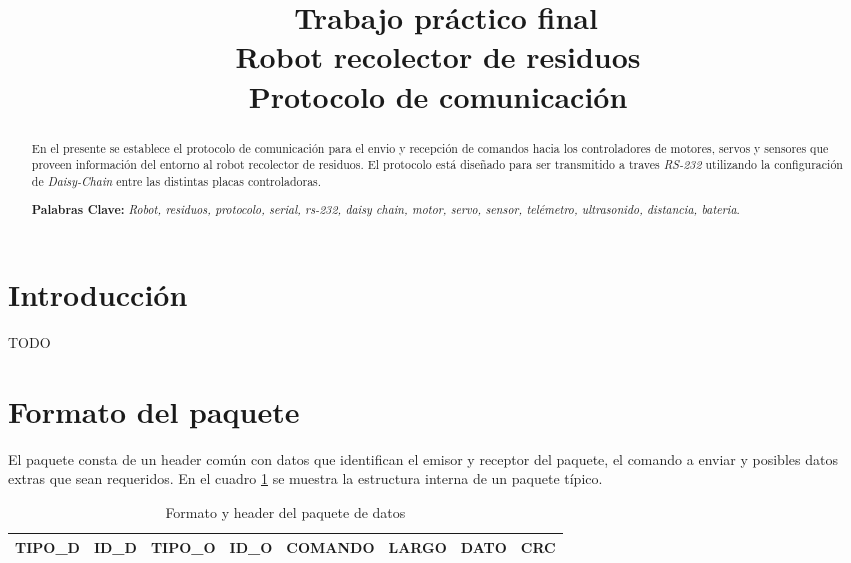 \documentclass[a4paper,11pt]{article}
\begin{document}
\title{{\ Trabajo pr\'actico final \\ Robot recolector de residuos \\ Protocolo de comunicaci\'on}}



\maketitle
\begin{abstract}
En el presente se establece el protocolo de comunicaci\'on para el envio y recepci\'on de comandos hacia los controladores
de motores, servos y sensores que proveen informaci\'on del entorno al robot recolector de residuos. El protocolo est\'a dise\~nado
para ser transmitido a traves \emph{RS-232} utilizando la configuraci\'on de \emph{Daisy-Chain} entre las distintas placas controladoras.

\textbf{Palabras Clave: }\emph{Robot, residuos, protocolo, serial, rs-232, daisy chain, motor, servo, sensor, tel\'emetro, ultrasonido, distancia, bateria}.
\end{abstract}



\section{Introducci\'on}
\label{introduccion}

TODO

\section{Formato del paquete}
\label{formato_paquete}


El paquete consta de un header com\'un con datos que identifican el emisor y receptor del paquete, el comando a enviar y posibles datos extras que sean requeridos.
En el cuadro \ref{formato_paquete_tabla} se muestra la estructura interna de un paquete t\'ipico.

\begin{table}[h]
\begin{center}
\begin{tabular}{|c|c|c|c|c|c|c|c|}
\hline
TIPO\_D & ID\_D & TIPO\_O & ID\_O & COMANDO & LARGO & DATO & CRC \\
\hline
\end{tabular}
\caption{Formato y header del paquete de datos}
\label{formato_paquete_tabla}
\end{center}
\end{table}
\end{document}
